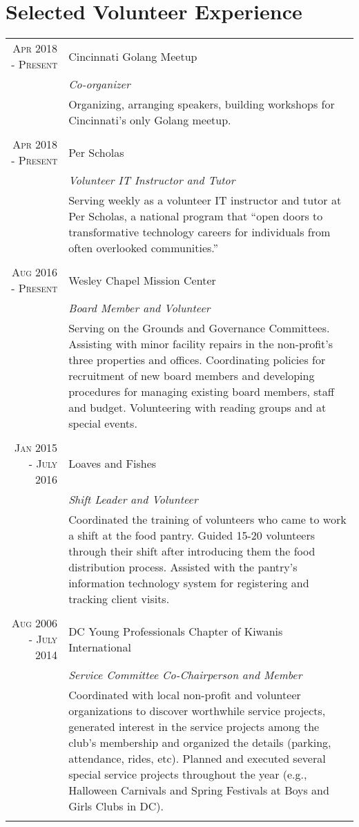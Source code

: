 \documentclass[a4paper,10pt]{article} %
\begin{document}
\section{Selected Volunteer Experience}
\begin{tabular}{r|p{11cm}}

\textsc{Apr 2018 - Present} & Cincinnati Golang Meetup\\
& \emph{Co-organizer} \\
& \footnotesize{Organizing, arranging speakers, building workshops for Cincinnati's only Golang meetup.} \\
\multicolumn{2}{c}{} \\

\textsc{Apr 2018 - Present} & Per Scholas\\
& \emph{Volunteer IT Instructor and Tutor} \\
& \footnotesize{Serving weekly as a volunteer IT instructor and tutor at Per Scholas, a national program that ``open doors to transformative technology careers for individuals from often overlooked communities.''} \\
\multicolumn{2}{c}{} \\

\textsc{Aug 2016 - Present} & Wesley Chapel Mission Center\\
& \emph{Board Member and Volunteer} \\
& \footnotesize{Serving on the Grounds and Governance Committees. Assisting with minor facility repairs in the non-profit's three properties and offices. Coordinating policies for recruitment of new board members and developing procedures for managing existing board members, staff and budget. Volunteering with reading groups and at special events.} \\
\multicolumn{2}{c}{} \\

\textsc{Jan 2015 - July 2016} & Loaves and Fishes\\
& \emph{Shift Leader and Volunteer} \\
& \footnotesize{Coordinated the training of volunteers who came to work a shift at the food pantry. Guided 15-20 volunteers through their shift after introducing them the food distribution process. Assisted with the pantry's information technology system for registering and tracking client visits.} \\
\multicolumn{2}{c}{} \\

\textsc{Aug 2006 - July 2014} & DC Young Professionals Chapter of Kiwanis International\\
& \emph{Service Committee Co-Chairperson and Member} \\
& \footnotesize{Coordinated with local non-profit and volunteer organizations to discover worthwhile service projects, generated interest in the service projects among the club's membership and organized the details (parking, attendance, rides, etc). Planned and executed several special service projects throughout the year (e.g., Halloween Carnivals and Spring Festivals at Boys and Girls Clubs in DC). } \\
\multicolumn{2}{c}{} \\


\end{tabular}
\end{document}
